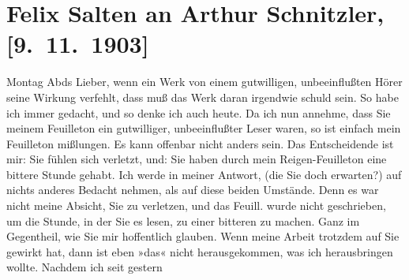                \section[Felix Salten an Arthur Schnitzler, {[}9. 11. 1903{]}]{ Felix Salten an Arthur Schnitzler, {[}9. 11. 1903{]}}\nopagebreak{}\rehead{ }\begin{ledgroupsized}[t]{13cm}\normalsize\beginnumbering \toendnotes[C]{\smallbreak\pagebreak[2]} 
\toendnotes[C]{\smallbreak}\pstart
           \raggedleft{}{\pb}Montag Abds \pend
           \pstart
           Lieber, wenn ein Werk von einem gutwilligen, unbeeinflußten Hörer
               seine Wirkung verfehlt, dass muß das Werk daran irgendwie schuld sein. So habe ich
               immer gedacht, und so denke ich auch heute. Da ich nun annehme, dass Sie meinem Feuilleton ein gutwilliger,
               unbeeinflußter Leser waren, so ist einfach mein Feuilleton mißlungen. Es kann
               offenbar nicht anders sein.\pend
           \pstart
           Das Entscheidende ist mir: Sie fühlen sich verletzt, und: Sie haben durch mein Reigen-Feuilleton eine bittere
               Stunde gehabt. Ich werde in meiner Antwort, (die Sie doch erwarten?) auf nichts
               anderes Bedacht nehmen, als auf diese beiden Umstände. Denn es war nicht meine
               Absicht, Sie zu verletzen, und das Feuill. wurde nicht geschrieben, um die Stunde, in
               der Sie es lesen, zu einer bitteren zu machen. Ganz im Gegentheil, wie Sie mir
               hoffentlich glauben.\pend
           \pstart
           Wenn meine Arbeit trotzdem auf Sie gewirkt hat, dann ist eben »das« nicht
               herausgekommen, was ich herausbringen wollte. Nachdem ich seit gestern

\end{ledgroupsized}
